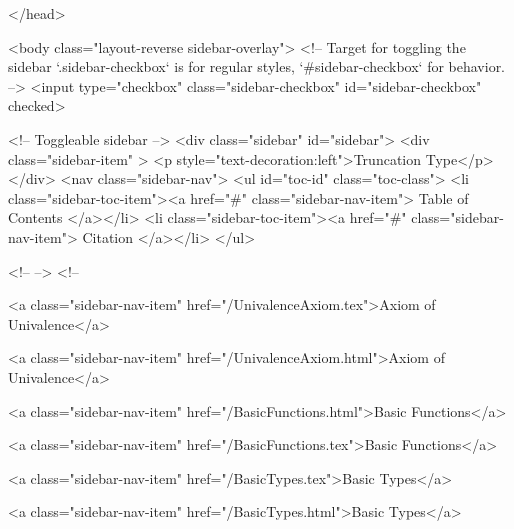   
</head>




  <body class="layout-reverse sidebar-overlay">
    <!-- Target for toggling the sidebar `.sidebar-checkbox` is for regular
     styles, `#sidebar-checkbox` for behavior. -->
<input type="checkbox" class="sidebar-checkbox" id="sidebar-checkbox" checked>

<!-- Toggleable sidebar -->
<div class="sidebar" id="sidebar">
  <div class="sidebar-item" >
    <p style="text-decoration:left">Truncation Type</p>
  </div>
  <nav class="sidebar-nav">
    <ul id="toc-id" class="toc-class">
  <li class="sidebar-toc-item"><a href="#" class="sidebar-nav-item"> Table of Contents </a></li>
  <li class="sidebar-toc-item"><a href="#" class="sidebar-nav-item"> Citation </a></li>
</ul>


    <!--  -->
    <!-- 
      
    
      
    
      
    
      
    
      
        
      
    
      
        
          <a class="sidebar-nav-item" href="/UnivalenceAxiom.tex">Axiom of Univalence</a>
        
      
    
      
        
          <a class="sidebar-nav-item" href="/UnivalenceAxiom.html">Axiom of Univalence</a>
        
      
    
      
        
          <a class="sidebar-nav-item" href="/BasicFunctions.html">Basic Functions</a>
        
      
    
      
        
          <a class="sidebar-nav-item" href="/BasicFunctions.tex">Basic Functions</a>
        
      
    
      
        
          <a class="sidebar-nav-item" href="/BasicTypes.tex">Basic Types</a>
        
      
    
      
        
          <a class="sidebar-nav-item" href="/BasicTypes.html">Basic Types</a>
        
      
    
